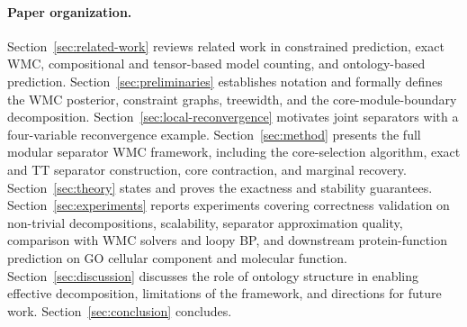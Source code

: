 \paragraph{Paper organization.}
Section~\ref{sec:related-work} reviews related work in constrained
prediction, exact WMC, compositional and tensor-based model counting,
and ontology-based prediction.
Section~\ref{sec:preliminaries} establishes notation and formally
defines the WMC posterior, constraint graphs, treewidth, and the
core-module-boundary decomposition.
Section~\ref{sec:local-reconvergence} motivates joint separators
with a four-variable reconvergence example.
Section~\ref{sec:method} presents the full modular separator WMC
framework, including the core-selection algorithm, exact and TT
separator construction, core contraction, and marginal recovery.
Section~\ref{sec:theory} states and proves the exactness and stability
guarantees.
Section~\ref{sec:experiments} reports experiments covering correctness
validation on non-trivial decompositions, scalability, separator
approximation quality, comparison with WMC solvers and loopy BP, and
downstream protein-function prediction on GO cellular component and
molecular function.
Section~\ref{sec:discussion} discusses the role of ontology structure
in enabling effective decomposition, limitations of the framework, and
directions for future work.
Section~\ref{sec:conclusion} concludes.
